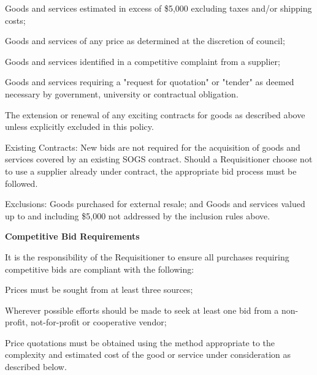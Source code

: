 \begin{longenum}[label*=\thesection.\arabic*., align=left]
\begin{longenum} [label*=\arabic*., align=left]
	\item Goods and services estimated in excess of \$5,000 excluding taxes and/or shipping costs;
	\item Goods and services of any price as determined at the discretion of council; 
	\item Goods and services identified in a competitive complaint from a supplier;
	\item Goods and services requiring a "request for quotation" or "tender" as deemed necessary by government, university or contractual obligation.
	\item The extension or renewal of any exciting contracts for goods as described above unless explicitly excluded in this policy.
	
	\item Existing Contracts: \newline
	New bids are not required for the acquisition of goods and services covered by an existing SOGS contract. Should a Requisitioner choose not to use a supplier already under contract, the appropriate bid process must be followed.
	
	\item Exclusions: \newline
	Goods purchased for external resale; and
	Goods and services valued up to and including \$5,000 not addressed by the inclusion rules above.

\end{longenum}

\item \textbf{Competitive Bid Requirements}
\begin{longenum} [label*=\arabic*., align=left]
	\item It is the responsibility of the Requisitioner to ensure all purchases requiring competitive bids are compliant with the following:
		\begin{longenum} [label*=\arabic*., align=left]
	\item Prices must be sought from at least three sources;
	\item Wherever possible efforts should be made to seek at least one bid from a non-profit, not-for-profit or cooperative vendor;
	\item Price quotations must be obtained using the method appropriate to the complexity and estimated cost of the good or service under consideration as described below.
\end{longenum}	
\end{longenum}


\end{longenum}
